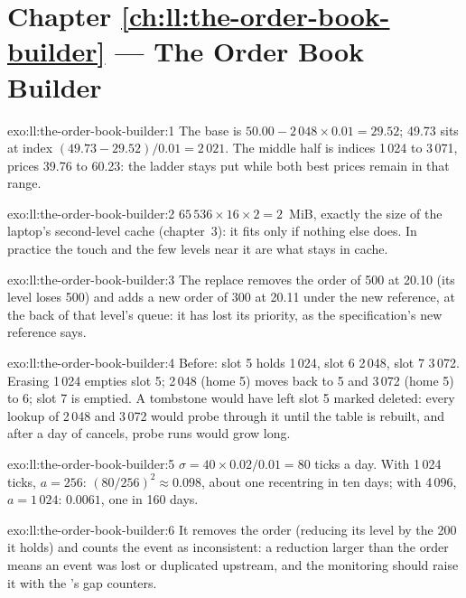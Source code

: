 \section*{Chapter \ref{ch:ll:the-order-book-builder} --- The Order Book Builder}

\begin{solution}{exo:ll:the-order-book-builder:1}
The base is $50.00 - 2\,048 \times 0.01 = 29.52$; 49.73 sits at index $(49.73 - 29.52)/0.01 = 2\,021$. The middle half is
indices 1\,024 to 3\,071, prices 39.76 to 60.23: the ladder stays put while both best prices remain in that range.
\end{solution}

\begin{solution}{exo:ll:the-order-book-builder:2}
$65\,536 \times 16 \times 2 = 2$~MiB, exactly the size of the laptop's second-level cache (chapter~3): it fits only if nothing
else does. In practice the touch and the few levels near it are what stays in cache.
\end{solution}

\begin{solution}{exo:ll:the-order-book-builder:3}
The replace removes the order of 500 at 20.10 (its level loses 500) and adds a new order of 300 at 20.11 under the new
reference, at the back of that level's queue: it has lost its priority, as the specification's new reference says.
\end{solution}

\begin{solution}{exo:ll:the-order-book-builder:4}
Before: slot 5 holds 1\,024, slot 6 2\,048, slot 7 3\,072. Erasing 1\,024 empties slot 5; 2\,048 (home 5) moves back to 5 and
3\,072 (home 5) to 6; slot 7 is emptied. A tombstone would have left slot 5 marked deleted: every lookup of 2\,048 and 3\,072
would probe through it until the table is rebuilt, and after a day of cancels, probe runs would grow long.
\end{solution}

\begin{solution}{exo:ll:the-order-book-builder:5}
$\sigma = 40 \times 0.02 / 0.01 = 80$ ticks a day. With 1\,024 ticks, $a = 256$: $(80/256)^2 \approx 0.098$, about one
recentring in ten days; with 4\,096, $a = 1\,024$: $0.0061$, one in 160 days.
\end{solution}

\begin{solution}{exo:ll:the-order-book-builder:6}
It removes the order (reducing its level by the 200 it holds) and counts the event as inconsistent: a reduction larger than
the order means an event was lost or duplicated upstream, and the monitoring should raise it with the 's gap
counters.
\end{solution}

